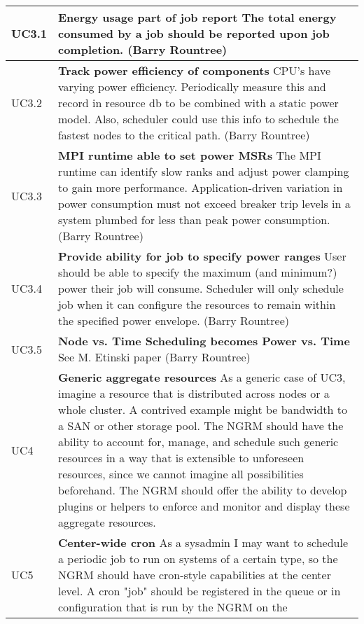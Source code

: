 \begin{longtable}{|p{1cm}|p{15cm}|}
  \hline
  UC3.1	& \textbf{Energy usage part of job report}\newline
	The total energy consumed by a job should be reported upon job
	completion. (Barry Rountree)\\
  \hline
  UC3.2	& \textbf{Track power efficiency of components}\newline
	CPU's have varying power efficiency. Periodically measure this and
	record in resource db to be combined with a static power model.
	Also, scheduler could use this info to schedule the fastest nodes
	to the critical path. (Barry Rountree)\\
  \hline
  UC3.3	& \textbf{MPI runtime able to set power MSRs}\newline
	The MPI runtime can identify slow ranks and adjust power clamping
	to gain more performance. Application-driven variation in power
	consumption must not exceed breaker trip levels in a system plumbed
	for less than peak power consumption. (Barry Rountree)\\
  \hline
  UC3.4	& \textbf{Provide ability for job to specify power ranges}\newline
	User should be able to specify the maximum (and minimum?) power their
	job will consume.  Scheduler will only schedule job when it can
	configure the resources to remain within the specified power envelope.
	(Barry Rountree)\\
  \hline
  UC3.5	& \textbf{Node vs. Time Scheduling becomes Power vs. Time}\newline
	See M. Etinski paper\cite{PowerOpt} (Barry Rountree)\\
  \hline
  UC4 & \textbf{Generic aggregate resources}\newline
	As a generic case of UC3, imagine a resource that is distributed
	across nodes or a whole cluster. A contrived example might be
	bandwidth to a SAN or other storage pool. The NGRM should have the
	ability to account for, manage, and schedule such generic resources
	in a way that is extensible to unforeseen resources, since we cannot
	imagine all possibilities beforehand. The NGRM should offer the
	ability to develop plugins or helpers to enforce and monitor and
	display these aggregate resources.\\
  \hline
  UC5 & \textbf{Center-wide cron}\newline
	As a sysadmin I may want to schedule a periodic job to run on
	systems of a certain type, so the NGRM should have cron-style
	capabilities at the center level. A cron "job" should be registered
	in the queue or in configuration that is run by the NGRM on the

\end{longtable}
